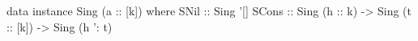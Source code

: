 \begin{code}
data instance Sing (a :: [k]) where
  SNil  :: Sing '[]
  SCons :: Sing (h :: k)
        -> Sing (t :: [k])
        -> Sing (h ': t)
\end{code}
